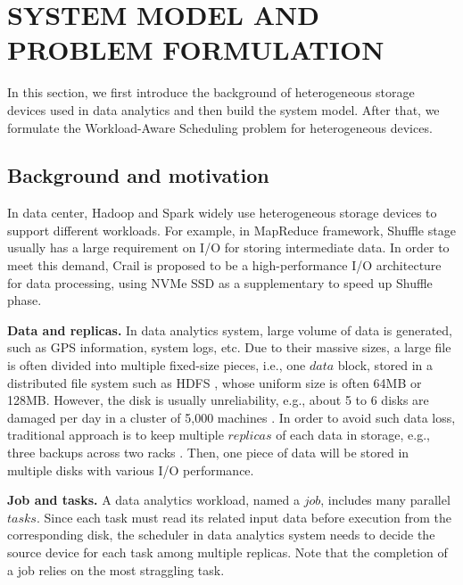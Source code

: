 \documentclass[conference]{IEEEtran}
\begin{document}
\section{SYSTEM MODEL AND PROBLEM FORMULATION}\label{SYSTEM_MODEL}
In this section, we first introduce the background of heterogeneous storage devices used in data analytics and then build the system model. After that, we formulate the Workload-Aware Scheduling problem for heterogeneous devices.

\subsection{Background and motivation}\label{AA}

In data center, Hadoop and Spark widely use heterogeneous storage devices to support different workloads. For example, in MapReduce framework, Shuffle stage \cite{b42} \cite{b41} usually has a large requirement on I/O for storing intermediate data. In order to meet this demand, Crail \cite{b37} is proposed to be a high-performance I/O architecture for data processing, using NVMe SSD \cite{b45} as a supplementary to speed up Shuffle phase.

\textbf{Data and replicas.} In data analytics system, large volume of data is generated, such as GPS information\cite{b38}, system logs\cite{b39}, etc. Due to their massive sizes, a large file is often divided into multiple fixed-size pieces, i.e., one $data$ block, stored in a distributed file system such as HDFS \cite{b19}, whose uniform size is often 64MB or 128MB. However, the disk is usually unreliability, e.g., about 5 to 6 disks are damaged per day in a cluster of 5,000 machines \cite{b32}. In order to avoid such data loss, traditional approach is to keep multiple $replicas$ of each data in storage, e.g., three backups across two racks \cite{b19}. Then, one piece of data will be stored in multiple disks with various I/O performance.

\textbf{Job and tasks.} A data analytics workload, named a $job$, includes many parallel $tasks$. Since each task must read its related input data before execution from the corresponding disk, the scheduler in data analytics system needs to decide the source device for each task among multiple replicas. Note that the completion of a job relies on the most straggling task.
\end{document}

